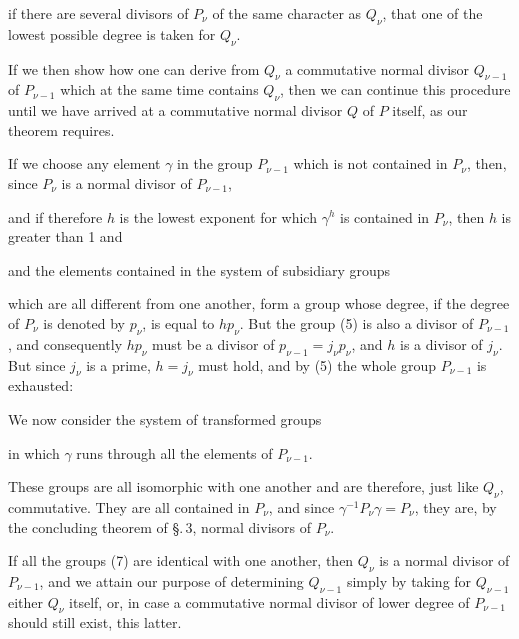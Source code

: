 
if there are several divisors of $P_\nu$ of the same character as $Q_\nu$,
that one of the lowest possible degree is taken for $Q_\nu$.

If we then show how one can derive from $Q_\nu$ a commutative
normal divisor $Q_{\nu-1}$ of $P_{\nu-1}$ which at the same time
contains $Q_\nu$, then we can continue this procedure until
we have arrived at a commutative normal divisor $Q$ of $P$ itself,
as our theorem requires.

If we choose any element $\gamma$ in the group $P_{\nu-1}$
which is not contained in $P_\nu$, then, since $P_\nu$ is a normal divisor
of $P_{\nu-1}$,


and if therefore $h$ is the lowest exponent for which $\gamma^h$ is
contained in $P_\nu$, then $h$ is greater than 1 and


and the elements contained in the system of subsidiary groups


which are all different from one another,
form a group whose degree, if the degree of $P_\nu$ is denoted by $p_\nu$,
is equal to $h p_\nu$. But the group (5) is also
a divisor of $P_{\nu-1}$, and consequently $h p_\nu$ must be a divisor of
$p_{\nu-1} = j_\nu p_\nu$, and $h$ is a divisor of $j_\nu$. But since $j_\nu$
is a prime, $h = j_\nu$ must hold, and by (5) the
whole group $P_{\nu-1}$ is exhausted:


We now consider the system of transformed groups


in which $\gamma$ runs through all the elements of $P_{\nu-1}$.

These groups are all isomorphic with one another and are
therefore, just like $Q_\nu$, commutative. They are all contained in $P_\nu$,
and since $\gamma^{-1} P_\nu \gamma = P_\nu$, they are, by the concluding theorem of \S.\,3,
normal divisors of $P_\nu$.

If all the groups (7) are identical with one another, then
$Q_\nu$ is a normal divisor of $P_{\nu-1}$, and we attain our purpose
of determining $Q_{\nu-1}$ simply by taking for $Q_{\nu-1}$ either $Q_\nu$ itself,
or, in case a commutative normal divisor of lower
degree of $P_{\nu-1}$ should still exist, this latter.
